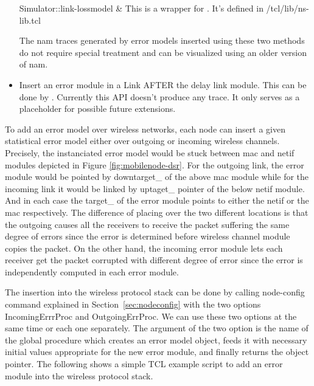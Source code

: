 \begin{itemize}
\begin{alist}
    Simulator::link-lossmodel    &
    This is a wrapper for . It's
    defined in \ns/tcl/lib/ns-lib.tcl 
  \end{alist}
  
  The nam traces generated by error models inserted using these two
  methods do not require special treatment and can be visualized using
  an older version of nam. 

\item Insert an error module in a Link AFTER the delay link module. 
  This can be done by . 
  Currently this API doesn't produce any trace. It only serves as a
  placeholder for possible future extensions. 
\end{itemize}

To add an error model over wireless networks, each node can insert 
a given statistical error model either over outgoing or incoming wireless channels.
Precisely, the instanciated error model would be stuck between mac and netif modules 
depicted in Figure \ref{fig:mobilenode-dsr}. For the outgoing link, the error module
would be pointed by downtarget\_ of the above mac module while for the incoming link 
it would be linked by uptaget\_ pointer of the below netif module. And in each case 
the target\_ of the error module points to either the netif or the mac respectively.  
The difference of placing over the two different locations is that the outgoing causes
all the receivers to receive the packet suffering the same degree of errors since the error is
determined before wireless channel module copies the packet. On the other
hand, the incoming error module lets each receiver get the packet corrupted with different
degree of error since the error is independently computed in each error module.

The insertion into the wireless protocol stack can be done by calling
node-config command explained in Section~\ref{sec:nodeconfig} with
the two options IncomingErrrProc and OutgoingErrProc. We can use these two options 
at the same time or each one separately.  The argument of the two option is the
name of the global procedure which creates an error model object,
feeds it with necessary initial values appropriate for the new error
module, and finally returns the object pointer. The following shows a
simple TCL example script to add an error module into the wireless
protocol stack.

